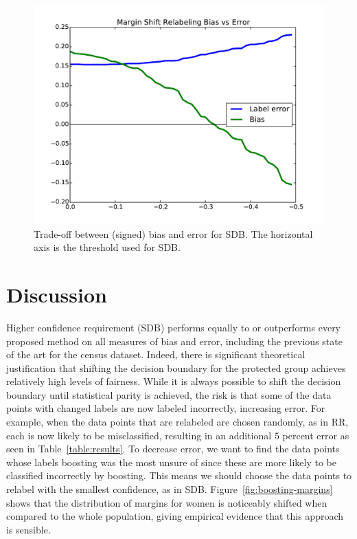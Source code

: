 \documentclass{article}
\begin{document}
\begin{figure}[t]
\centering
\includegraphics[width=\columnwidth]{images/relabeling-msr-tradeoffs.pdf}
\caption{Trade-off between (signed) bias and error for SDB. The
horizontal axis is the threshold used for SDB.}
\label{fig:tradeoffs}
\end{figure}

\section{Discussion}\label{sec:discussion}

Higher confidence requirement (SDB) performs equally to or outperforms every proposed
method on all measures of bias and error, including the previous state of the
art for the census dataset. Indeed, there is significant theoretical
justification that shifting the decision boundary for the protected group
achieves relatively high levels of fairness.  While it is always possible to
shift the decision boundary until statistical parity is achieved, the risk is
that some of the data points with changed labels are now labeled incorrectly,
increasing error.  For example, when the data points that are relabeled are
chosen randomly, as in RR, each is now likely to be misclassified, resulting in
an additional $5$ percent error as seen in Table~\ref{table:results}.  To
decrease error, we want to find the data points whose labels boosting was the
most unsure of since these are more likely to be classified incorrectly by
boosting.  This means we should choose the data points to relabel with the
smallest confidence, as in SDB.  Figure~\ref{fig:boosting-margins} shows that the
distribution of margins for women is noticeably shifted when compared to the
whole population, giving empirical evidence that this approach is sensible.
\end{document}
